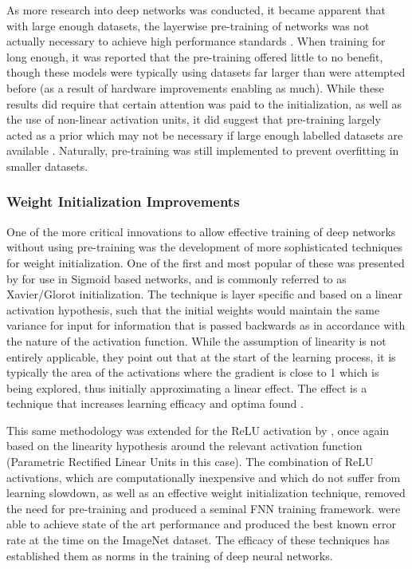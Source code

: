 \documentclass[a4paper,11pt,oneside]{article}
\theoremstyle{plain}
\theoremstyle{definition}
\begin{document}
	As more research into deep networks was conducted, it became apparent that with large enough datasets, the
	layerwise pre-training of networks was not actually necessary to achieve high performance standards 
	\citep{ImageNet, Glorot2, Ciresan}. When training for long enough, it was reported that the pre-training offered little to no 
	benefit, though these models were typically using datasets far larger than were attempted before (as a result of
	hardware improvements enabling as much). While these results did require that certain attention was paid to the 
	initialization, as well as the use of non-linear activation units, it did suggest that pre-training largely acted as a prior 
	which may not be necessary if large enough labelled datasets are available \citep{Bengio3}. Naturally, pre-training was still 
	implemented to prevent overfitting in smaller datasets.
	\hfill \break 
	
	\subsubsection{Weight Initialization Improvements}\label{lr_weight_init}
	
	One of the more critical innovations to allow effective training of deep networks without using pre-training was the development of more sophisticated techniques for weight initialization. One of the first and most popular of these was presented by \citet{Glorot} for use in Sigmoid based networks, 
	and is commonly referred to as Xavier/Glorot initialization. The technique is layer specific and based on a linear activation
	hypothesis, such that the initial weights would maintain the same variance for input for information that is passed backwards as in 
	accordance with the nature of the activation function. While the assumption of linearity is not entirely applicable, they point out that at the 
	start of the learning process, it is typically the area of the activations where the gradient is close to 1 which is being explored, thus initially approximating 
	a linear effect. The effect is a technique that increases learning efficacy and optima found \citep{Glorot}. \newline
	
	This same methodology was extended for the ReLU activation by \citet{He}, once again based on the linearity hypothesis around the 
	relevant activation function (Parametric Rectified Linear Units in this case). The combination of ReLU activations, which are computationally inexpensive and which do not suffer from learning slowdown, as well as an effective weight initialization technique, removed the need for pre-training and produced a seminal FNN training framework. \citet{He} were able to 
	achieve state of the art performance and produced the best known error rate at the time on the ImageNet dataset. The efficacy of these techniques has established 
	them as norms in the training of deep neural networks.
	
\end{document}
